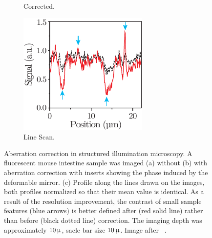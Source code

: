 \begin{figure}[tbh]
\begin{subfigure}[b]{0.25\textwidth}
                \caption{Corrected.}
                \label{fig:SI_corrected}
        \end{subfigure}
        \begin{subfigure}[b]{0.25\textwidth}
                \includegraphics[width=\textwidth]{images/structured_illumination_scan}
                \caption{Line Scan.}
                \label{fig:SI_scan}
        \end{subfigure}
								
        \caption{Aberration correction in structured illumination microscopy. 
A fluorescent mouse intestine sample was imaged (a) without (b) with 
aberration correction with inserts showing the phase induced by the 
deformable mirror. (c) Profile along the lines drawn on the images, both 
profiles normalized so that their mean value is identical. As a result of the 
resolution improvement, the contrast of small sample features (blue arrows) 
is better defined after (red solid line) rather than before (black dotted 
line) correction. The imaging depth was approximately $\unit[10]{\upmu}$, 
sacle bar size $\unit[10]{\upmu}$. Image after~\cite{wide_AOM_structured_illu}
.}
\label{fig:structured_light_correction}
\end{figure} 

